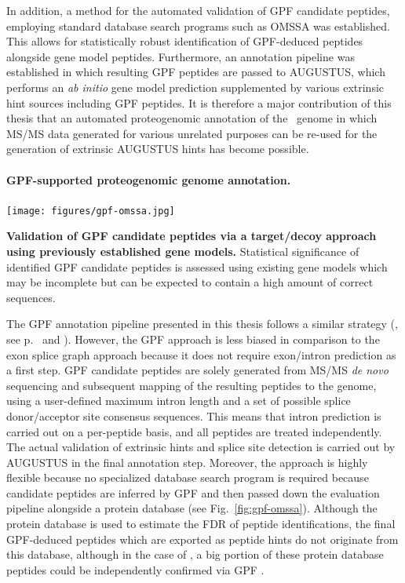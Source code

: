 In addition, a method for the automated validation of GPF candidate peptides,
employing standard database search programs such as OMSSA was established.
This allows for statistically robust identification of GPF-deduced peptides
alongside gene model peptides.
Furthermore, an annotation pipeline was established in which resulting GPF
peptides are passed to AUGUSTUS, which performs an {\em ab initio} gene 
model prediction supplemented by various extrinsic hint sources including
GPF peptides.
It is therefore a major contribution of this thesis that an automated
proteogenomic annotation of the \cre~genome in which MS/MS data generated
for various unrelated purposes can be re-used for the generation of
extrinsic AUGUSTUS hints has become possible.

\paragraph{GPF-supported proteogenomic genome annotation.}

\begin{SCtopfig}
\texttt{[image: figures/gpf-omssa.jpg]}
\caption{
{\bf Validation of GPF candidate peptides via a target/decoy approach
    using previously established gene models.} 
    Statistical significance of identified GPF candidate peptides is 
    assessed using existing gene models which may be incomplete but
    can be expected to contain a high amount of correct sequences.
}
\label{fig:gpf-omssa}
\end{SCtopfig}

The GPF annotation pipeline presented in this thesis follows a similar strategy
(\cite{Specht2011_GPF}, see p.~\pageref{section:gpf} and \pageref{paper:gpf}).
However, the GPF approach is less biased in comparison to the exon splice graph
approach because it does not require exon/intron prediction as a first step.
GPF candidate peptides are solely generated from MS/MS {\em de novo} sequencing
and subsequent mapping of the resulting peptides to the genome, using 
a user-defined maximum intron length and a set of possible splice donor/acceptor 
site consensus sequences.
This means that intron prediction is carried out on a per-peptide basis, and
all peptides are treated independently.
The actual validation of extrinsic hints and splice site detection is
carried out by AUGUSTUS in the final annotation step.
Moreover, the approach is highly flexible because no specialized database
search program is required because candidate peptides are inferred by GPF
and then passed down the evaluation pipeline alongside a protein database
(see Fig.~\ref{fig:gpf-omssa}).
Although the protein database is used to estimate the FDR of peptide 
identifications, the final GPF-deduced peptides which are exported as
peptide hints do not originate from this database, although in the case
of \cre, a big portion of these protein database peptides could be 
independently confirmed via GPF \citep{Specht2011_GPF}.


